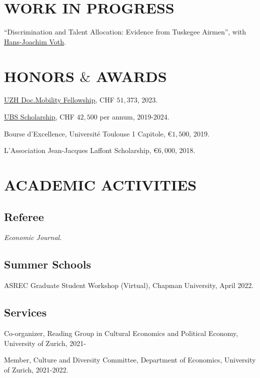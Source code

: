 \documentclass[letterpaper]{article}
\renewenvironment{itemize}{
  \begin{list}{}{
    \setlength{\leftmargin}{1.5em}
  }
}{
  \end{list}
}
\begin{document}
\section*{\MakeUppercase{work in progress}}
\begin{itemize}
	\item ``Discrimination and Talent Allocation: Evidence from Tuskegee Airmen'', with \href{http://www.jvoth.com}{Hans-Joachim Voth}.
\end{itemize}

\section*{HONORS $\&$ AWARDS}
\begin{itemize}
    \item \href{https://www.research.uzh.ch/en/funding/phd/uzh-doc-mobility.html}{UZH Doc.Mobility Fellowship}, CHF $51,373$, 2023.
    \item \href{https://www.ubscenter.uzh.ch/en/scholarships.html}{UBS Scholarship}, CHF $42,500$ per annum, 2019-2024.
    \item Bourse d'Excellence, Université Toulouse 1 Capitole, \euro $1,500$, 2019.
    \item L’Association Jean-Jacques Laffont Scholarship, \euro $6,000$, 2018.
\end{itemize}

\section*{\MakeUppercase{academic activities}}
\subsection*{Referee}
\begin{itemize}
    \item \textit{Economic Journal}. %
\end{itemize}
\subsection*{Summer Schools}
\begin{itemize}
    \item ASREC Graduate Student Workshop (Virtual), Chapman University, April 2022.
\end{itemize}
\subsection*{Services}
\begin{itemize}
    \item Co-organizer, Reading Group in Cultural Economics and Political Economy, University of Zurich, 2021-
    \item Member, Culture and Diversity Committee, Department of Economics, University of Zurich, 2021-2022.
\end{itemize}
\end{document}
